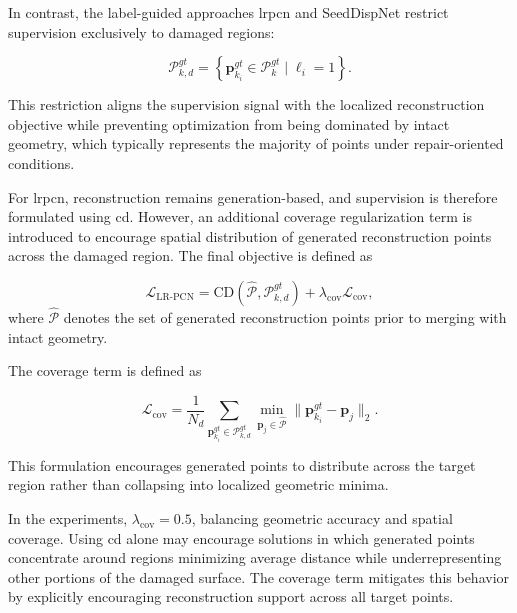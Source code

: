 In contrast, the label-guided approaches \ac{lrpcn} and SeedDispNet restrict supervision exclusively to damaged regions:

\begin{equation}
\mathcal{P}_{k,d}^{gt}
=
\left\{
\mathbf{p}_{k_i}^{gt}
\in
\mathcal{P}_{k}^{gt}
\mid
\ell_i = 1
\right\}.
\end{equation}

This restriction aligns the supervision signal with the localized reconstruction objective while preventing optimization from being dominated by intact geometry, which typically represents the majority of points under repair-oriented conditions.

For \ac{lrpcn}, reconstruction remains generation-based, and supervision is therefore formulated using \ac{cd}. However, an additional coverage regularization term is introduced to encourage spatial distribution of generated reconstruction points across the damaged region. The final objective is defined as

\begin{equation}
\mathcal{L}_{\text{LR-PCN}} =
\text{CD}(\hat{\mathcal{P}}, \mathcal{P}_{k,d}^{gt})
+
\lambda_{\text{cov}}
\mathcal{L}_{\text{cov}},
\end{equation}
where $\hat{\mathcal{P}}$ denotes the set of generated reconstruction points prior to merging with intact geometry.

The coverage term is defined as

\begin{equation}
\mathcal{L}_{\text{cov}}
=
\frac{1}{N_d}
\sum_{\mathbf{p}_{k_i}^{gt}\in \mathcal{P}_{k,d}^{gt}}
\min_{\mathbf{p}_j \in \hat{\mathcal{P}}}
\|
\mathbf{p}_{k_i}^{gt}
-
\mathbf{p}_j
\|_2 .
\end{equation}

This formulation encourages generated points to distribute across the target region rather than collapsing into localized geometric minima.

In the experiments, $\lambda_{\text{cov}} = 0.5$, balancing geometric accuracy and spatial coverage. Using \ac{cd} alone may encourage solutions in which generated points concentrate around regions minimizing average distance while underrepresenting other portions of the damaged surface. The coverage term mitigates this behavior by explicitly encouraging reconstruction support across all target points.

